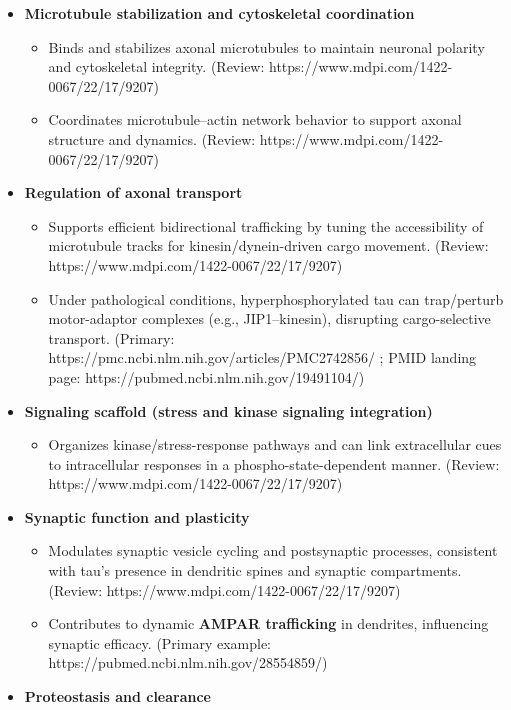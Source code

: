 \documentclass[
  letterpaper,
  DIV=11,
  numbers=noendperiod]{scrreprt}
\providecommand{\tightlist}{%
  \setlength{\itemsep}{0pt}\setlength{\parskip}{0pt}}
\begin{document}
\begin{itemize}
\tightlist
\item
  \textbf{Microtubule stabilization and cytoskeletal coordination}

  \begin{itemize}
  \tightlist
  \item
    Binds and stabilizes axonal microtubules to maintain neuronal
    polarity and cytoskeletal integrity. (Review:
    https://www.mdpi.com/1422-0067/22/17/9207)
  \item
    Coordinates microtubule--actin network behavior to support axonal
    structure and dynamics. (Review:
    https://www.mdpi.com/1422-0067/22/17/9207)
  \end{itemize}
\item
  \textbf{Regulation of axonal transport}

  \begin{itemize}
  \tightlist
  \item
    Supports efficient bidirectional trafficking by tuning the
    accessibility of microtubule tracks for kinesin/dynein-driven cargo
    movement. (Review: https://www.mdpi.com/1422-0067/22/17/9207)
  \item
    Under pathological conditions, hyperphosphorylated tau can
    trap/perturb motor-adaptor complexes (e.g., JIP1--kinesin),
    disrupting cargo-selective transport. (Primary:
    https://pmc.ncbi.nlm.nih.gov/articles/PMC2742856/ ; PMID landing
    page: https://pubmed.ncbi.nlm.nih.gov/19491104/)
  \end{itemize}
\item
  \textbf{Signaling scaffold (stress and kinase signaling integration)}

  \begin{itemize}
  \tightlist
  \item
    Organizes kinase/stress-response pathways and can link extracellular
    cues to intracellular responses in a phospho-state-dependent manner.
    (Review: https://www.mdpi.com/1422-0067/22/17/9207)
  \end{itemize}
\item
  \textbf{Synaptic function and plasticity}

  \begin{itemize}
  \tightlist
  \item
    Modulates synaptic vesicle cycling and postsynaptic processes,
    consistent with tau's presence in dendritic spines and synaptic
    compartments. (Review: https://www.mdpi.com/1422-0067/22/17/9207)
  \item
    Contributes to dynamic \textbf{AMPAR trafficking} in dendrites,
    influencing synaptic efficacy. (Primary example:
    https://pubmed.ncbi.nlm.nih.gov/28554859/)
  \end{itemize}
\item
  \textbf{Proteostasis and clearance}


\end{itemize}
\end{document}
